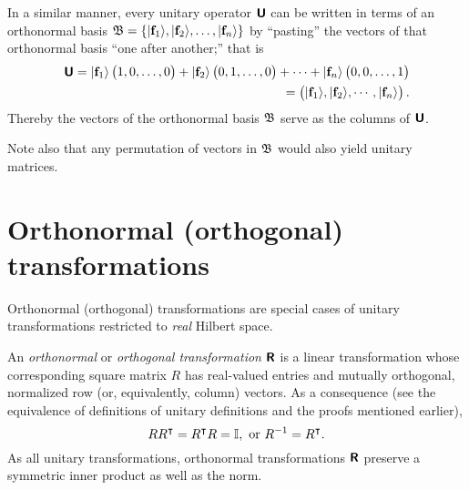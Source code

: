 In a similar manner, every unitary operator  $\textsf{\textbf{U}}$  can be written in terms of an orthonormal basis
${\frak B}=\{\vert {\bf f}_1 \rangle , \vert {\bf f}_2 \rangle, \ldots , \vert {\bf f}_n \rangle\}$
by ``pasting'' the  vectors of that orthonormal basis ``one after another;''
that is
\begin{equation}
\begin{split}
\textsf{\textbf{U}}
=
\vert {\bf f}_1 \rangle \begin{pmatrix} 1,0,\ldots ,0\end{pmatrix} +
\vert {\bf f}_2 \rangle \begin{pmatrix} 0,1,\ldots ,0\end{pmatrix} +
\cdots +
\vert {\bf f}_n \rangle \begin{pmatrix} 0,0,\ldots ,1\end{pmatrix}   \\
=
\begin{pmatrix}
\vert {\bf f}_1 \rangle ,
\vert {\bf f}_2 \rangle ,
\cdots,
\vert {\bf f}_n \rangle
\end{pmatrix}
.
\end{split}
\label{2015-m-ch-fdlvs-uniascolv}
\end{equation}
Thereby the vectors of the orthonormal basis  ${\frak B}$ serve as the
columns of $\textsf{\textbf{U}}$.

Note also that any permutation of vectors in ${\frak B}$ would also yield unitary matrices.


\section{Orthonormal (orthogonal) transformations}
\label{2015-m-ch-fdlvs-orthproj}

Orthonormal (orthogonal) transformations are special cases of unitary transformations restricted to {\em real} Hilbert space.

An {\em orthonormal} or {\em orthogonal transformation} $\textsf{\textbf{R}}$ is a linear transformation
whose corresponding square matrix $R$ has real-valued entries
and mutually orthogonal, normalized row (or, equivalently, column) vectors.
As a consequence (see the equivalence of definitions of unitary definitions and the proofs mentioned earlier),
\begin{equation}
RR^\intercal = R^\intercal R= {\Bbb I}, \textrm{ or } R^{-1}=R^\intercal  .
\end{equation}
As all unitary transformations, orthonormal transformations $\textsf{\textbf{R}}$
preserve a symmetric inner product as well as the norm.

